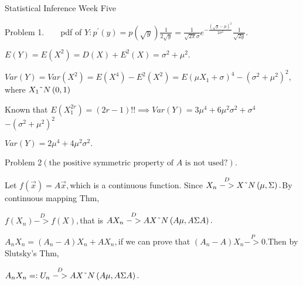 \documentclass{article}
\begin{document}
Statistical Inference Week Five


Problem 1.$\qquad $pdf of $Y:p^{\prime }\left( y\right) =p\left( \sqrt{y}%
\right) \frac{1}{2\sqrt{y}}=\frac{1}{\sqrt{2\pi }\sigma }e^{-\frac{\left( 
\sqrt{y}-\mu \right) ^{2}}{2\sigma ^{2}}}\frac{1}{\sqrt{2y}}.$

$E\left( Y\right) =E\left( X^{2}\right) =D\left( X\right) +E^{2}\left(
X\right) =\sigma ^{2}+\mu ^{2}.$

$Var\left( Y\right) =Var\left( X^{2}\right) =E\left( X^{4}\right)
-E^{2}\left( X^{2}\right) =E\left( \mu X_{1}+\sigma \right) ^{4}-\left(
\sigma ^{2}+\mu ^{2}\right) ^{2},$where $X_{1}\symbol{126}N\left( 0,1\right) 
$

Known that $E\left( X_{1}^{2r}\right) =\left( 2r-1\right) !!\implies
Var\left( Y\right) =3\mu ^{4}+6\mu ^{2}\sigma ^{2}+\sigma ^{4}$ $-\left(
\sigma ^{2}+\mu ^{2}\right) ^{2}$

$Var\left( Y\right) =2\mu ^{4}+4\mu ^{2}\sigma ^{2}.$

Problem 2$\left( \text{the positive symmetric property of }A\text{ is not
used?}\right) $.

\bigskip Let $f\left( \vec{x}\right) =A\vec{x},$which is a continuous
function. Since $X_{n}\overset{D}{->}X\symbol{126}N\left( \mu ,\Sigma
\right) .$By continuous mapping Thm,

$f\left( X_{n}\right) \overset{D}{->}f\left( X\right) ,$that is $AX_{n}%
\overset{D}{->}AX\symbol{126}N\left( A\mu ,A\Sigma A\right) .$

$A_{n}X_{n}=\left( A_{n}-A\right) X_{n}+AX_{n},$if we can prove that $\left(
A_{n}-A\right) X_{n}\overset{P}{->}0.$Then by Slutsky's Thm,

$A_{n}X_{n}=:U_{n}\overset{D}{->}AX\symbol{126}N\left( A\mu ,A\Sigma
A\right) .$
\end{document}
